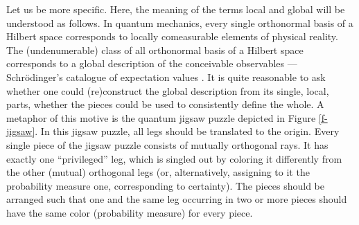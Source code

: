 \documentclass[%
  preprint,
 showpacs,
 showkeys,
 preprintnumbers,
 amsmath,amssymb,
 aps,
 rmp,
  longbibliography,
 ]{revtex4-1}
\begin{document}
Let us be more specific.
Here, the meaning of the terms local and global will be
understood as follows.
In quantum mechanics, every single orthonormal basis of a Hilbert space
corresponds to locally comeasurable elements of physical reality.
The (undenumerable) class of all orthonormal basis of a Hilbert
space
corresponds to a global description of the conceivable
observables --- Schr\"odinger's catalogue of expectation values
\cite{schrodinger}.
It is quite reasonable to ask whether one could (re)construct the
global description from its
single, local, parts, whether the pieces could be used to
consistently
define the whole. A metaphor of this motive is the quantum jigsaw puzzle
depicted in Figure \ref{f-jigsaw}.
In this jigsaw puzzle, all legs should be translated to the origin.
Every single piece of the jigsaw puzzle consists of
mutually orthogonal rays. It has exactly
one
``privileged'' leg, which
is singled out by coloring it differently from the other (mutual)
orthogonal legs (or, alternatively, assigning to it the probability
measure one, corresponding to certainty).
The pieces should be arranged such that one and the same leg occurring
in two or more pieces should have the same color (probability measure)
for every piece.
\end{document}
